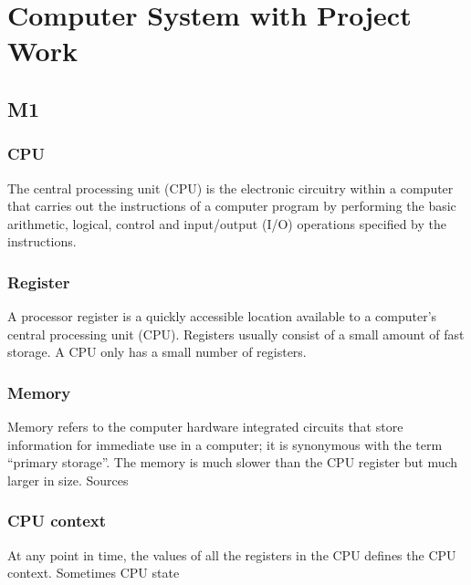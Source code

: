\chapter{Computer System with Project Work}

\newpage

\begin{multicols}{2}
\section{M1}
\subsection{CPU}
The central processing unit (CPU) is the electronic circuitry within a
computer that carries out the instructions of a computer program by
performing the basic arithmetic, logical, control and input/output (I/O)
operations specified by the instructions.

\subsection{Register}
A processor register is a quickly accessible location available to a
computer’s central processing unit (CPU). Registers usually consist of
a small amount of fast storage. A CPU only has a small number of
registers.

\subsection{Memory}
Memory refers to the computer hardware integrated circuits that store
information for immediate use in a computer; it is synonymous with the
term “primary storage”. The memory is much slower than the CPU
register but much larger in size.
Sources

\subsection{CPU context}
At any point in time, the values of all
the registers in the CPU defines the
CPU context. Sometimes CPU state


\end{multicols}
